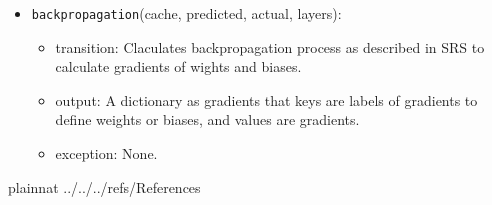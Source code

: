 \documentclass[12pt, titlepage]{article}
\def\code#1{\texttt{#1}}
\begin{document}
\begin{itemize}
  \item \code{backpropagation}(cache, predicted, actual, layers):
  \begin{itemize}
    \item transition: Claculates backpropagation process as described in SRS \cite{SRS} 
    to calculate gradients of wights and biases. 
    \item output: A dictionary as gradients that keys are labels of gradients to define weights or biases, 
    and values are gradients.
    \item exception: None.
  \end{itemize}

\end{itemize}

\newpage

 {plainnat}
 {../../../refs/References}

\newpage





\end{document}
